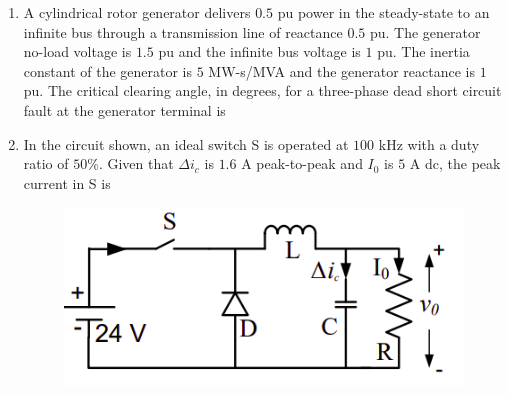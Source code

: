 \documentclass[journal,12pt,onecolumn]{IEEEtran}
\theoremstyle{remark}
\begin{document}
\begin{enumerate}[start=1, label=Q.\arabic*]
\begin{enumerate}
\end{enumerate}
\hfill{}

\item A cylindrical rotor generator delivers $0.5$ pu power in the steady-state to an infinite bus through a transmission line of reactance $0.5$ pu. The generator no-load voltage is $1.5$ pu and the infinite bus voltage is $1$ pu. The inertia constant of the generator is $5$ MW-s/MVA and the generator reactance is $1$ pu. The critical clearing angle, in degrees, for a three-phase dead short circuit fault at the generator terminal is

\begin{enumerate}
\end{enumerate}
\hfill{}

\item In the circuit shown, an ideal switch S is operated at $100$ kHz with a duty ratio of $50\%$. Given that $\Delta i_{c}$ is $1.6$ A peak-to-peak and $I_{0}$ is $5$ A dc, the peak current in S is
\begin{figure}[H]
    \centering
    \includegraphics[width=0.5\columnwidth]{Figures/q35.png}
    \caption{}
\end{figure}

\begin{enumerate}
\end{enumerate}
\hfill{}


\end{enumerate}
\end{document}
